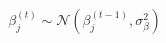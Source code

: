 \documentclass[preview]{standalone}
\begin{document}
\begin{align*}
\beta_j^{(t)} \sim \mathcal{N} ( \beta_j^{(t-1)} , \sigma_\beta^2 )
\end{align*}
\end{document}
